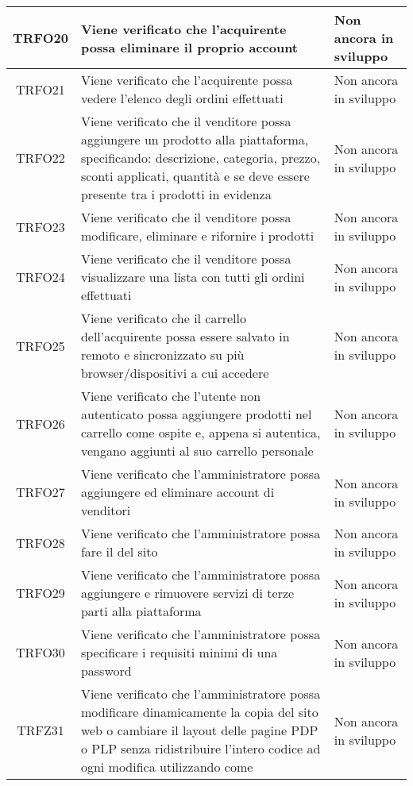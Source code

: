 \begin{longtable}{|c| C{10cm} |C{3cm}|}
	TRFO20 & Viene verificato che l'acquirente possa eliminare il proprio account & Non ancora in sviluppo\\ \hline
	TRFO21 & Viene verificato che l'acquirente possa vedere l'elenco degli ordini effettuati & Non ancora in sviluppo\\ \hline
	TRFO22 & Viene verificato che il venditore possa aggiungere un prodotto alla piattaforma, specificando: descrizione, categoria, prezzo, sconti applicati, quantità e se deve essere presente tra i prodotti in evidenza & Non ancora in sviluppo\\ \hline
    TRFO23 & Viene verificato che il venditore possa modificare, eliminare e rifornire i prodotti & Non ancora in sviluppo\\ \hline
    TRFO24 & Viene verificato che il venditore possa visualizzare una lista con tutti gli ordini effettuati & Non ancora in sviluppo\\ \hline
    TRFO25 & Viene verificato che il carrello dell'acquirente possa essere salvato in remoto e sincronizzato su più browser/dispositivi a cui accedere & Non ancora in sviluppo\\ \hline
    TRFO26 & Viene verificato che l'utente non autenticato possa aggiungere prodotti nel carrello come ospite e, appena si autentica, vengano aggiunti al suo carrello personale & Non ancora in sviluppo\\ \hline
    TRFO27 & Viene verificato che l'amministratore possa aggiungere ed eliminare account di venditori & Non ancora in sviluppo\\ \hline
    TRFO28 & Viene verificato che l'amministratore possa fare il  del sito & Non ancora in sviluppo\\ \hline
    TRFO29 & Viene verificato che l'amministratore possa aggiungere e rimuovere servizi di terze parti alla piattaforma & Non ancora in sviluppo\\ \hline
    TRFO30 & Viene verificato che l'amministratore possa specificare i requisiti minimi di una password & Non ancora in sviluppo\\ \hline
    TRFZ31 & Viene verificato che l'amministratore possa modificare dinamicamente la copia del sito web o cambiare il layout delle pagine PDP o PLP senza ridistribuire l'intero codice ad ogni modifica utilizzando  come  & Non ancora in sviluppo\\ \hline
\end{longtable}
